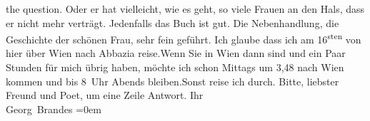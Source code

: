 \begin{ledgroupsized}[t]{13cm}
{                        the question}{}\label{K_L01116_1h}. Oder er
                    hat vielleicht, wie es geht, so viele Frauen an den Hals, dass er nicht mehr
                    verträgt. Jedenfalls {\pb}das Buch ist gut. Die
                    Nebenhandlung, die Geschichte der schönen Frau, sehr fein geführt.\pend
           \pstart
           Ich glaube dass ich am 16\textsuperscript{sten} von hier über Wien nach Abbazia reise.\hspace*{1.5em}Wenn Sie in Wien dann sind
                    und ein Paar Stunden für mich übrig haben, möchte ich schon Mittags um
                        3,48 nach Wien kommen und bis
                        8 Uhr Abends bleiben.\hspace*{1.5em}Sonst
                    reise ich durch.\pend
           \pstart
           Bitte, liebster Freund und Poet, um eine Zeile Antwort.\pend
           \pstart
           Ihr{\\[\baselineskip]}\spacefill\mbox{Georg Brandes}\pend
           \leftskip=0em{}\endnumbering{}\end{ledgroupsized}  \newcommand{\dateiname}{L01116}\newcommand{\titel}{Georg Brandes an Arthur Schnitzler, 10. 5. [1901]}\newcommand{\editorInnen}{Martin Anton Müller und Gerd-Hermann Susen}
      